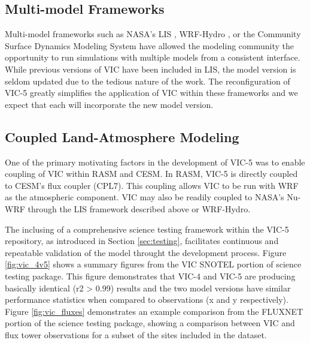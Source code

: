 \documentclass[gmd, manuscript]{copernicus}
\begin{document}
  \subsection{Multi-model Frameworks}
    \label{sec:multimodel}
    Multi-model frameworks such as NASA's LIS \citep{Kumar_2006}, WRF-Hydro \citep{Gochis_2013}, or the Community Surface Dynamics Modeling System \citep{Peckham_2016} have allowed the modeling community the opportunity to run simulations with multiple models from a consistent interface.
    While previous versions of VIC have been included in LIS, the model version is seldom updated due to the tedious nature of the work.
    The reconfiguration of VIC-5 greatly simplifies the application of VIC within these frameworks and we expect that each will incorporate the new model version.

  \subsection{Coupled Land-Atmosphere Modeling}
    \label{sec:coupled_apps}
    One of the primary motivating factors in the development of VIC-5 was to enable coupling of VIC within RASM and CESM.
    In RASM, VIC-5 is directly coupled to CESM's flux coupler (CPL7).
    This coupling allows VIC to be run with WRF as the atmospheric component.
    VIC may also be readily coupled to NASA's Nu-WRF through the LIS framework described above or WRF-Hydro.


  The inclusing of a comprehensive science testing framework within the VIC-5 repository, as introduced in Section \ref{sec:testing}, facilitates continuous and repeatable validation of the model throught the development process.
  Figure \ref{fig:vic_4v5} shows a summary figures from the VIC SNOTEL portion of science testing package.
  This figure demonstrates that VIC-4 and VIC-5 are producing basically identical (r2 > 0.99) results and the two model versions have similar performance statistics when compared to observations (x and y respectively).
  Figure \ref{fig:vic_fluxes} demonstrates an example comparison from the FLUXNET portion of the science testing package, showing a comparison between VIC and flux tower observations for a subset of the sites included in the dataset.
\end{document}
